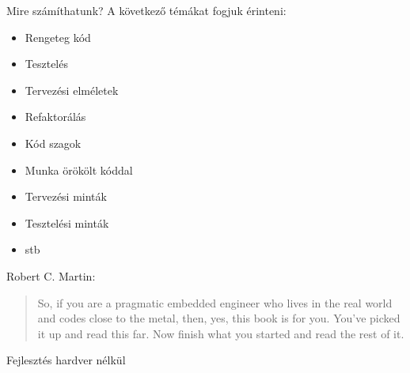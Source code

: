 \begin{frame}{Mire számíthatunk?}
 A következő témákat fogjuk érinteni:

  \begin{itemize}[<+->]
    \item Rengeteg kód
    \item Tesztelés
    \item Tervezési elméletek
    \item Refaktorálás
    \item Kód szagok
    \item Munka örökölt kóddal
    \item Tervezési minták
    \item Tesztelési minták
    \item stb
  \end{itemize}

\end{frame}

\begin{frame}{}
  Robert C. Martin:

  \begin{quotation}
    So, if you are a pragmatic embedded engineer who
    lives in the real world and codes close to the metal, then, yes, this
    book is for you. You've picked it up and read this far. Now finish
    what you started and read the rest of it.
  \end{quotation}

\end{frame}

\begin{frame}{Fejlesztés hardver nélkül}

\end{frame}

